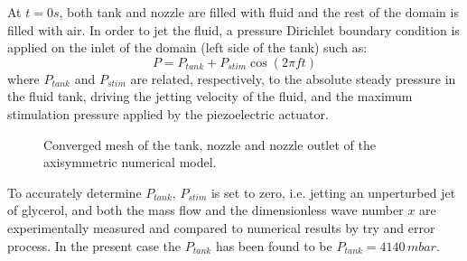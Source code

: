 \documentclass[twocolumn,10pt]{asme2ej}
\begin{document}
At $t=0s$, both tank and nozzle are filled with fluid and the rest of the domain is filled with air. In order to jet the fluid, a pressure Dirichlet boundary condition is applied on the inlet of the domain (left side of the tank) such as:
\begin{equation} \label{eq:plim}
    P=P_{tank}+P_{stim}\cos(2\pi f t)
\end{equation}
where $P_{tank}$ and $P_{stim}$ are related, respectively, to the absolute steady pressure in the fluid tank, driving the jetting velocity of the fluid, and the maximum stimulation pressure applied by the piezoelectric actuator.
\begin{figure}[H]
    \centering    
    \caption{Converged mesh of the tank, nozzle and nozzle outlet of the axisymmetric numerical model.} 
    \label{fig:meshGlycerol}
\end{figure}

To accurately determine $P_{tank}$, $P_{stim}$ is set to zero, i.e. jetting an unperturbed jet of glycerol, and both the mass flow and the dimensionless wave number $x$ are experimentally measured and compared to numerical results by try and error process. In the present case the $P_{tank}$ has been found to be $P_{tank}=4140 \, mbar$. 
\end{document}
